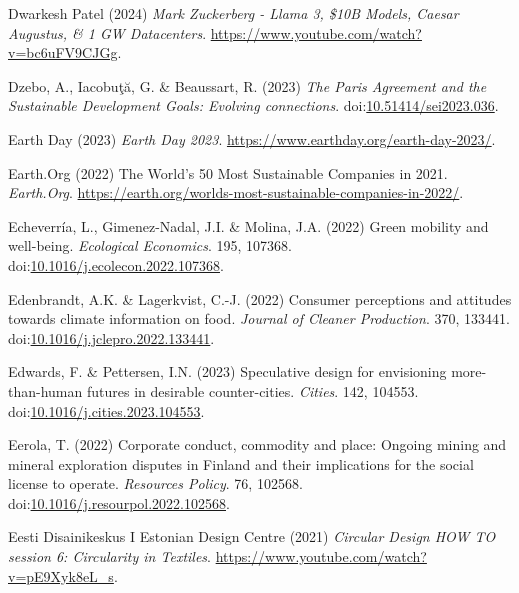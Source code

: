 \documentclass[
  letterpaper,
  DIV=11,
  numbers=noendperiod]{scrartcl}
\newlength{\cslhangindent}
\newenvironment{CSLReferences}[2] %
 {\begin{list}{}{%
  \setlength{\itemindent}{0pt}
  \setlength{\leftmargin}{0pt}
  \setlength{\parsep}{0pt}
  \ifodd #1
   \setlength{\leftmargin}{\cslhangindent}
   \setlength{\itemindent}{-1\cslhangindent}
  \fi
  \setlength{\itemsep}{#2\baselineskip}}}
 {\end{list}}
\begin{document}
\begin{CSLReferences}{0}{1}
Dwarkesh Patel (2024) \emph{Mark {Zuckerberg} - {Llama} 3, \${10B
Models}, {Caesar Augustus}, \& 1 {GW Datacenters}}.
\url{https://www.youtube.com/watch?v=bc6uFV9CJGg}.

Dzebo, A., Iacobuţă, G. \& Beaussart, R. (2023) \emph{The {Paris
Agreement} and the {Sustainable Development Goals}: Evolving
connections}.
doi:\href{https://doi.org/10.51414/sei2023.036}{10.51414/sei2023.036}.

Earth Day (2023) \emph{Earth {Day} 2023}.
\url{https://www.earthday.org/earth-day-2023/}.

Earth.Org (2022) The {World}'s 50 {Most Sustainable Companies} in 2021.
\emph{Earth.Org}.
\url{https://earth.org/worlds-most-sustainable-companies-in-2022/}.

Echeverría, L., Gimenez-Nadal, J.I. \& Molina, J.A. (2022) Green
mobility and well-being. \emph{Ecological Economics}. 195, 107368.
doi:\href{https://doi.org/10.1016/j.ecolecon.2022.107368}{10.1016/j.ecolecon.2022.107368}.

Edenbrandt, A.K. \& Lagerkvist, C.-J. (2022) Consumer perceptions and
attitudes towards climate information on food. \emph{Journal of Cleaner
Production}. 370, 133441.
doi:\href{https://doi.org/10.1016/j.jclepro.2022.133441}{10.1016/j.jclepro.2022.133441}.

Edwards, F. \& Pettersen, I.N. (2023) Speculative design for envisioning
more-than-human futures in desirable counter-cities. \emph{Cities}. 142,
104553.
doi:\href{https://doi.org/10.1016/j.cities.2023.104553}{10.1016/j.cities.2023.104553}.

Eerola, T. (2022) Corporate conduct, commodity and place: {Ongoing}
mining and mineral exploration disputes in {Finland} and their
implications for the social license to operate. \emph{Resources Policy}.
76, 102568.
doi:\href{https://doi.org/10.1016/j.resourpol.2022.102568}{10.1016/j.resourpol.2022.102568}.

Eesti Disainikeskus I Estonian Design Centre (2021) \emph{Circular
{Design HOW TO} session 6: {Circularity} in {Textiles}}.
\url{https://www.youtube.com/watch?v=pE9Xyk8eL_s}.


\end{CSLReferences}
\end{document}
